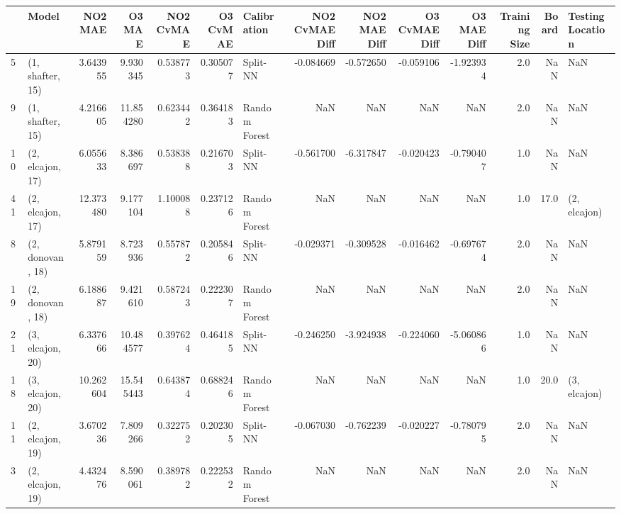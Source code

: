 \begin{tabular}{llrrrrlrrrrrrl}
\toprule
{} &             Model &    NO2 MAE &     O3 MAE &  NO2 CvMAE &  O3 CvMAE &    Calibration &  NO2 CvMAE Diff &  NO2 MAE Diff &  O3 CvMAE Diff &  O3 MAE Diff &  Training Size &  Board & Testing Location \\
\midrule
5  &  (1, shafter, 15) &   3.643955 &   9.930345 &   0.538773 &  0.305077 &       Split-NN &       -0.084669 &     -0.572650 &      -0.059106 &    -1.923934 &            2.0 &    NaN &              NaN \\
9  &  (1, shafter, 15) &   4.216605 &  11.854280 &   0.623442 &  0.364183 &  Random Forest &             NaN &           NaN &            NaN &          NaN &            2.0 &    NaN &              NaN \\
10 &  (2, elcajon, 17) &   6.055633 &   8.386697 &   0.538388 &  0.216703 &       Split-NN &       -0.561700 &     -6.317847 &      -0.020423 &    -0.790407 &            1.0 &    NaN &              NaN \\
41 &  (2, elcajon, 17) &  12.373480 &   9.177104 &   1.100088 &  0.237126 &  Random Forest &             NaN &           NaN &            NaN &          NaN &            1.0 &   17.0 &     (2, elcajon) \\
8  &  (2, donovan, 18) &   5.879159 &   8.723936 &   0.557872 &  0.205846 &       Split-NN &       -0.029371 &     -0.309528 &      -0.016462 &    -0.697674 &            2.0 &    NaN &              NaN \\
19 &  (2, donovan, 18) &   6.188687 &   9.421610 &   0.587243 &  0.222307 &  Random Forest &             NaN &           NaN &            NaN &          NaN &            2.0 &    NaN &              NaN \\
21 &  (3, elcajon, 20) &   6.337666 &  10.484577 &   0.397624 &  0.464185 &       Split-NN &       -0.246250 &     -3.924938 &      -0.224060 &    -5.060866 &            1.0 &    NaN &              NaN \\
18 &  (3, elcajon, 20) &  10.262604 &  15.545443 &   0.643874 &  0.688246 &  Random Forest &             NaN &           NaN &            NaN &          NaN &            1.0 &   20.0 &     (3, elcajon) \\
11 &  (2, elcajon, 19) &   3.670236 &   7.809266 &   0.322752 &  0.202305 &       Split-NN &       -0.067030 &     -0.762239 &      -0.020227 &    -0.780795 &            2.0 &    NaN &              NaN \\
3  &  (2, elcajon, 19) &   4.432476 &   8.590061 &   0.389782 &  0.222532 &  Random Forest &             NaN &           NaN &            NaN &          NaN &            2.0 &    NaN &              NaN \\

\end{tabular}
